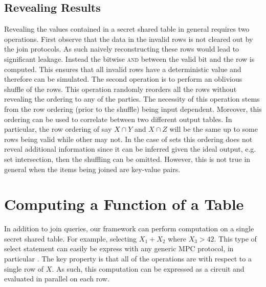 \subsection{Revealing Results}

Revealing the values contained in a secret shared table in general requires two operations. First observe that the data in the invalid rows is not cleared out by the join protocols. As such naively reconstructing these rows would lead to significant leakage. Instead the bitwise \textsc{and} between the valid bit and the row is computed. This ensures that all invalid rows have a deterministic value and therefore can be simulated. The second operation is to perform an oblivious shuffle of the rows. This operation randomly reorders all the rows without revealing the ordering to any of the parties. The necessity of this operation stems from the  row ordering (prior to the shuffle) being input dependent. Moreover, this ordering can be used to correlate between two different output tables. In particular, the row ordering of say $X\cap Y$ and $X\cap Z$ will be the same up to some rows being valid while other may not. In the case of sets this ordering does not reveal additional information since it can be inferred given the ideal output, e.g. set intersection, then the shuffling can be omitted. However, this is not true in general when the items being joined are key-value pairs. 


\section{Computing a Function of a Table}\label{sec:card}

In addition to join queries, our framework can perform computation on a single secret shared table. For example, selecting $X_1+X_2$  where $X_3>42$. This type of select statement can easily be express with any generic MPC protocol, in particular \cite{aby3, highthroughput}. The key property is that all of the operations are with respect to a single row of $X$. As such, this computation can be expressed as a circuit and evaluated in parallel on each row. 


